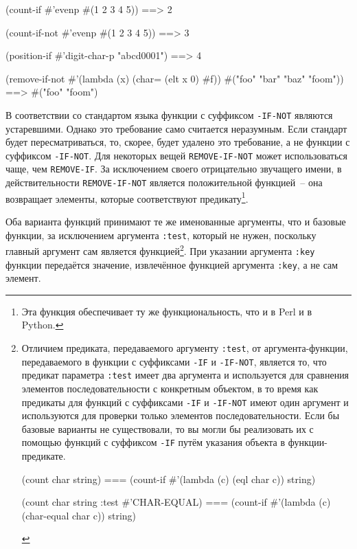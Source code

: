 \begin{myverb}
  (count-if #'evenp #(1 2 3 4 5))         ==> 2

  (count-if-not #'evenp #(1 2 3 4 5))     ==> 3

  (position-if #'digit-char-p "abcd0001") ==> 4

  (remove-if-not #'(lambda (x) (char= (elt x 0) #\bslash{}f))
    #("foo" "bar" "baz" "foom")) ==> #("foo" "foom")
\end{myverb}

В соответствии со стандартом языка функции с суффиксом \lstinline{-IF-NOT} являются
устаревшими.  Однако это требование само считается неразумным.  Если стандарт будет
пересматриваться, то, скорее, будет удалено это требование, а не функции с суффиксом
\lstinline{-IF-NOT}.  Для некоторых вещей \lstinline{REMOVE-IF-NOT} может использоваться чаще, чем
\lstinline{REMOVE-IF}.  За исключением своего отрицательно звучащего имени, в действительности
\lstinline{REMOVE-IF-NOT} является положительной функцией~-- она возвращает элементы, которые
соответствуют предикату\footnote{Эта функция обеспечивает ту же функциональность, что и
   в Perl и  в Python.}.

Оба варианта функций принимают те же именованные аргументы, что и базовые функции, за
исключением аргумента \lstinline{:test}, который не нужен, поскольку главный аргумент сам
является функцией\footnote{Отличием предиката, передаваемого аргументу \lstinline{:test}, от
  аргумента-функции, передаваемого в функции с суффиксами \lstinline{-IF} и \lstinline{-IF-NOT},
  является то, что предикат параметра \lstinline{:test} имеет два аргумента и используется для
  сравнения элементов последовательности с конкретным объектом, в то время как предикаты
  для функций с суффиксами \lstinline{-IF} и \lstinline{-IF-NOT} имеют один аргумент и используются
  для проверки только элементов последовательности.  Если бы базовые варианты не
  существовали, то вы могли бы реализовать их с помощью функций с суффиксом \lstinline{-IF}
  путём указания объекта в функции-предикате.

\begin{myverb}
  (count char string) ===
    (count-if #'(lambda (c) (eql char c)) string)
  
  (count char string :test #'CHAR-EQUAL) ===
    (count-if #'(lambda (c) (char-equal char c)) string)
\end{myverb}

}.  При указании аргумента \lstinline{:key} функции передаётся значение, извлечённое функцией
аргумента \lstinline{:key}, а не сам элемент.

